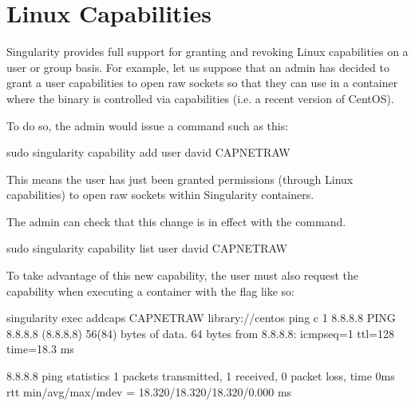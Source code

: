 \documentclass[letterpaper,10pt,english]{sphinxmanual}
\begin{document}
\section{Linux Capabilities}
\label{\detokenize{security_options:linux-capabilities}}
Singularity provides full support for granting and revoking Linux capabilities
on a user or group basis.  For example, let us suppose that an admin has
decided to grant a user capabilities to open raw sockets so that they can use
 in a container where the binary is controlled via capabilities (i.e. a
recent version of CentOS).

To do so, the admin would issue a command such as this:

%
\begin{sphinxVerbatim}[commandchars=\\\{\}]
\PYGZdl{} sudo singularity capability add \PYGZhy{}\PYGZhy{}user david CAP\PYGZus{}NET\PYGZus{}RAW
\end{sphinxVerbatim}

This means the user  has just been granted permissions (through Linux
capabilities) to open raw sockets within Singularity containers.

The admin can check that this change is in effect with the 
command.

%
\begin{sphinxVerbatim}[commandchars=\\\{\}]
\PYGZdl{} sudo singularity capability list \PYGZhy{}\PYGZhy{}user david
CAP\PYGZus{}NET\PYGZus{}RAW
\end{sphinxVerbatim}

To take advantage of this new capability, the user  must also request
the capability when executing a container with the  flag like so:

%
\begin{sphinxVerbatim}[commandchars=\\\{\}]
\PYGZdl{} singularity exec \PYGZhy{}\PYGZhy{}add\PYGZhy{}caps CAP\PYGZus{}NET\PYGZus{}RAW library://centos ping \PYGZhy{}c 1 8.8.8.8
PING 8.8.8.8 (8.8.8.8) 56(84) bytes of data.
64 bytes from 8.8.8.8: icmp\PYGZus{}seq=1 ttl=128 time=18.3 ms

\PYGZhy{}\PYGZhy{}\PYGZhy{} 8.8.8.8 ping statistics \PYGZhy{}\PYGZhy{}\PYGZhy{}
1 packets transmitted, 1 received, 0\PYGZpc{} packet loss, time 0ms
rtt min/avg/max/mdev = 18.320/18.320/18.320/0.000 ms
\end{sphinxVerbatim}
\end{document}
